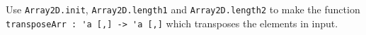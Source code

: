 Use \lstinline{Array2D.init}, \lstinline{Array2D.length1} and \lstinline{Array2D.length2} to make the function \lstinline{transposeArr : 'a [,] -> 'a [,]} which transposes the elements in input.
